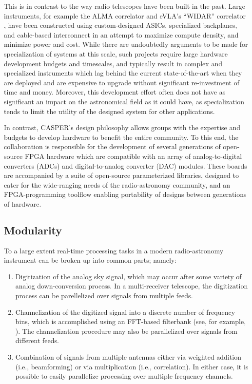 \documentclass{ws-jai}
\begin{document}
This is in contrast to the way radio telescopes have been built in the past.
Large instruments, for example the ALMA correlator \citep{alma-correlator} and
eVLA's ``WIDAR'' correlator \citep{evla}, have been constructed using
custom-designed ASICs, specialized
backplanes, and cable-based interconnect in an attempt to maximize compute
density, and minimize power and cost. While there are undoubtedly arguments to be made for specialization of systems at this scale, such projects require large
hardware development budgets and timescales, and typically result in complex
and specialized instruments which lag behind the current state-of-the-art when they are deployed and are expensive to upgrade without significant
re-investment of time and money. Moreover, this development effort often does not have as significant an impact on the astronomical field as it could have, as specialization tends to limit the utility of the designed system for other applications.

In contrast, CASPER's design philosophy allows groups with the expertise and
budgets to develop hardware to benefit the entire community. To this end, the collaboration
is responsible for the development of several generations of open-source FPGA hardware which are compatible with an array of analog-to-digital converters (ADCs) and digital-to-analog converter (DAC) modules. These boards are accompanied by a suite of open-source parameterized libraries, designed to cater for the wide-ranging needs of the radio-astronomy community, and an FPGA-programming toolflow enabling portability of designs between generations of hardware.



\subsection{Modularity}

To a large extent real-time processing tasks in a modern
radio-astronomy instrument can be broken up into common parts; namely:
\begin{enumerate}
    \item Digitization of the analog sky signal, which may occur after
    some variety of analog down-conversion process. In a multi-receiver telescope, the digitization process can be parellelized over signals from multiple feeds.
    
    \item Channelization of the digitized signal into a discrete number of
    frequency bins, which is accomplished using an FFT-based filterbank
    (see, for example, \citet{specbook}). The channelization procedure may also be parallelized over signals from different feeds.
    
    \item Combination of signals from multiple antennas either via weighted addition (i.e., beamforming) or via multiplication (i.e.,
    correlation). In either case, it is possible to easily parallelize processing
    over multiple frequency channels.
\end{enumerate}
\end{document}
